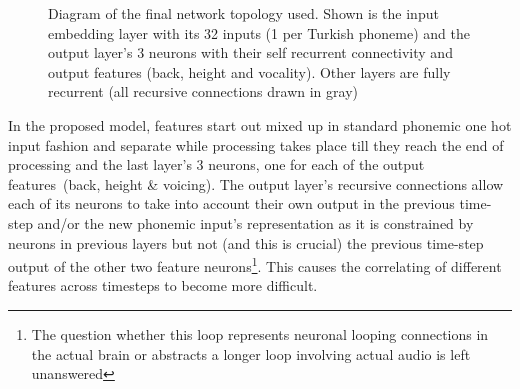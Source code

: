 \documentclass[a4paper,12pt]{article}
\begin{document}
\begin{figure}[!ht]
\centering
{}
\captionsetup{font=tiny}
\caption{Diagram of the final network topology used. Shown is the input embedding layer with its 32
inputs (1 per Turkish phoneme) and the output layer's 3 neurons with their self recurrent
connectivity and output features (back, height and vocality). Other layers are fully recurrent (all
recursive connections drawn in gray)}
\label{fig:NNdiagram}
\end{figure}

In the proposed model, features start out mixed up in standard phonemic one hot input fashion and
separate while processing takes place till they reach the end of processing and the last layer's 3
neurons, one for each of the output features\ (back, height \& voicing). The output layer's
recursive connections allow each of its neurons to take into account their own output in the previous
time-step and/or the new phonemic input's representation as it is constrained by neurons in
previous layers but not (and this is crucial) the previous time-step output of the other two
feature neurons\footnote{The question whether this loop represents neuronal looping connections in
the actual brain or abstracts a longer loop involving actual audio is left unanswered}. This
causes the correlating of different features across timesteps to become more difficult.
\end{document}
